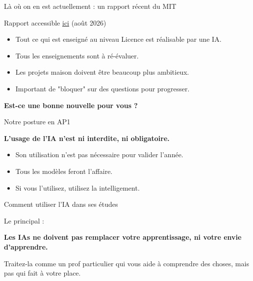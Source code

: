 \documentclass{beamer}
\begin{document}
\begin{frame}{Là où on en est actuellement : un rapport récent du MIT}

Rapport  accessible \underline{\href{https://aiandeducation.mit.edu/report/}{ici}} (août 2026)
     \begin{itemize}
         \item  Tout ce qui est enseigné au niveau Licence est réalisable par une IA.
         \item Tous les enseignements sont à ré-évaluer.
        \item Les projets maison doivent être beaucoup plus ambitieux.
        \item Important de "bloquer" sur des questions pour progresser.
    \end{itemize}
    
    \pause 
        
    \begin{center}
        \textbf{Est-ce une bonne nouvelle pour vous ? }
    \end{center}
   
\end{frame}

\begin{frame}{Notre posture en AP1}
\begin{center}
    \textbf{L'usage de l'IA n'est ni interdite, ni obligatoire.}
\end{center}
\pause
\begin{itemize}
    \item Son utilisation n'est pas nécessaire pour valider l'année. 
    \item Tous les modèles feront l'affaire. 
    \item Si vous l'utilisez, utilisez la intelligement.
\end{itemize}

\end{frame}

\begin{frame}{Comment utiliser l'IA dans ses études}

  Le principal :
\begin{center}
    \textbf{Les IAs ne doivent pas remplacer votre apprentissage, ni votre envie d'apprendre.}
\end{center}
\pause 
\vfill
Traitez-la comme un prof particulier qui vous aide à comprendre des choses, mais pas qui fait à votre place. 
\end{frame}
\end{document}
